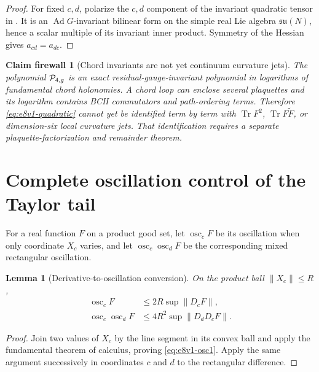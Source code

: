 \documentclass[11pt,oneside]{book}
\newtheorem{lemma}[theorem]{Lemma}
\newtheorem{firewall}[theorem]{Claim firewall}
\theoremstyle{definition}
\theoremstyle{remark}
\newcommand{\Tr}{\operatorname{Tr}}
\newcommand{\osc}{\operatorname{osc}}
\begin{document}
\begin{proof}
For fixed \(c,d\), polarize the \(c,d\) component of the invariant
quadratic tensor in .  It is an
\(\operatorname{Ad}G\)-invariant bilinear form on the simple real Lie
algebra \(\mathfrak{su}(N)\), hence a scalar multiple of its invariant
inner product.  Symmetry of the Hessian gives \(a_{cd}=a_{dc}\).
\end{proof}

\begin{firewall}[Chord invariants are not yet continuum curvature
jets]
\label{fire:e8v1-chord}
The polynomial \({\cal P}_{4,g}\) is an exact
residual-gauge-invariant polynomial in logarithms of fundamental chord
holonomies.  A chord loop can enclose several plaquettes and its
logarithm contains BCH commutators and path-ordering terms.  Therefore
\eqref{eq:e8v1-quadratic} cannot yet be identified term by term with
\(\Tr F^2\), \(\Tr F\widetilde F\), or dimension-six local curvature
jets.  That identification requires a separate plaquette-factorization
and remainder theorem.
\end{firewall}

\section{Complete oscillation control of the Taylor tail}
\label{sec:e8v1-oscillation}

For a real function \(F\) on a product good set, let
\(\osc_cF\) be its oscillation when only coordinate \(X_c\) varies,
and let \(\osc_c\osc_dF\) be the corresponding mixed rectangular
oscillation.

\begin{lemma}[Derivative-to-oscillation conversion]
\label{lem:e8v1-oscillation}
On the product ball \(\|X_c\|\leq R\),
\begin{align}
 \osc_cF
 &\leq2R\sup\|D_cF\|,                                \label{eq:e8v1-osc1}\\
 \osc_c\osc_dF
 &\leq4R^2\sup\|D_dD_cF\|.                           \label{eq:e8v1-osc2}
\end{align}
\end{lemma}

\begin{proof}
Join two values of \(X_c\) by the line segment in its convex ball and
apply the fundamental theorem of calculus, proving
\eqref{eq:e8v1-osc1}.  Apply the same argument successively in
coordinates \(c\) and \(d\) to the rectangular difference.
\end{proof}
\end{document}
